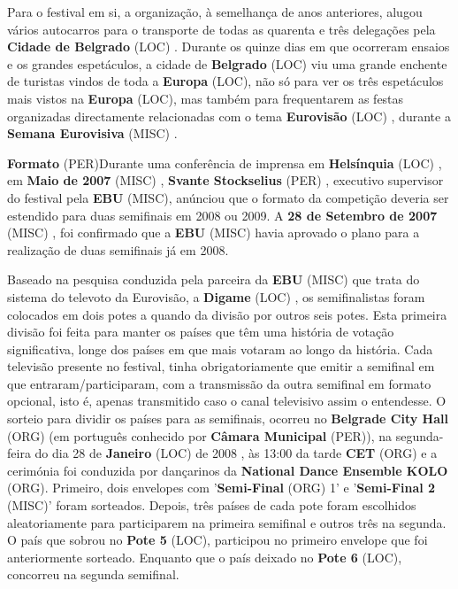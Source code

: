 \documentclass[12pt,a4paper]{article}
\begin{document}
Para o festival em si, a organização, à semelhança de anos anteriores, alugou vários autocarros para o transporte de todas as quarenta e três delegações pela \textbf{Cidade de Belgrado} (LOC) . Durante os quinze dias em que ocorreram ensaios e os grandes espetáculos, a cidade de \textbf{Belgrado} (LOC) viu uma grande enchente de turistas vindos de toda a \textbf{Europa} (LOC), não só para ver os três espetáculos mais vistos na \textbf{Europa} (LOC), mas também para frequentarem as festas organizadas directamente relacionadas com o tema \textbf{Eurovisão} (LOC) , durante a \textbf{Semana Eurovisiva} (MISC) .



\textbf{Formato} (PER)Durante uma conferência de imprensa em \textbf{Helsínquia} (LOC) , em \textbf{Maio de 2007} (MISC) , \textbf{Svante Stockselius} (PER) , executivo supervisor do festival pela \textbf{EBU} (MISC), anúnciou que o formato da competição deveria ser estendido para duas semifinais em 2008 ou 2009. A \textbf{28 de Setembro de 2007} (MISC) , foi confirmado que a \textbf{EBU} (MISC) havia aprovado o plano para a realização de duas semifinais já em 2008.

Baseado na pesquisa conduzida pela parceira da \textbf{EBU} (MISC) que trata do sistema do televoto da Eurovisão, a \textbf{Digame} (LOC) , os semifinalistas foram colocados em dois potes a quando da divisão por outros seis potes. Esta primeira divisão foi feita para manter os países que têm uma história de votação significativa, longe dos países em que mais votaram ao longo da história. Cada televisão presente no festival, tinha obrigatoriamente que emitir a semifinal em que entraram/participaram, com a transmissão da outra semifinal em formato opcional, isto é, apenas transmitido caso o canal televisivo assim o entendesse. O sorteio para dividir os países para as semifinais, ocorreu no \textbf{Belgrade City Hall} (ORG) (em português conhecido por \textbf{Câmara Municipal} (PER)), na segunda-feira do dia 28 de \textbf{Janeiro} (LOC) de 2008 , às 13:00 da tarde \textbf{CET} (ORG) e a cerimónia foi conduzida por dançarinos da \textbf{National Dance Ensemble KOLO} (ORG). Primeiro, dois envelopes com '\textbf{Semi-Final} (ORG) 1' e '\textbf{Semi-Final 2} (MISC)' foram sorteados. Depois, três países de cada pote foram escolhidos aleatoriamente para participarem na primeira semifinal e outros três na segunda. O país que sobrou no \textbf{Pote 5} (LOC), participou no primeiro envelope que foi anteriormente sorteado. Enquanto que o país deixado no \textbf{Pote 6} (LOC), concorreu na segunda semifinal.
\end{document}
